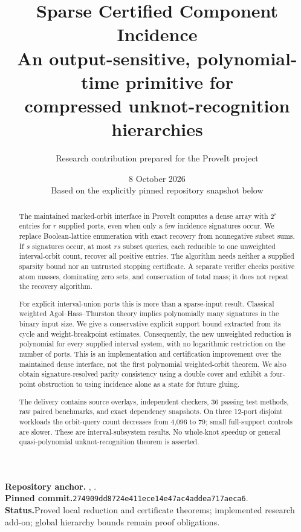 \documentclass[11pt,letterpaper]{article}
\title{\vspace{-1em}\textbf{Sparse Certified Component Incidence}\\[0.4em]
\Large An output-sensitive, polynomial-time primitive for\\
compressed unknot-recognition hierarchies}
\author{Research contribution prepared for the ProveIt project}
\date{8 October 2026\\[0.3em]\small Based on the explicitly pinned repository snapshot below}
\theoremstyle{definition}
\newcommand{\snapshot}{\texttt{274909dd8724e411ece14e47ac4addea717aeca6}}
\begin{document}
\maketitle
\thispagestyle{empty}
\begin{abstract}
The maintained marked-orbit interface in ProveIt computes a dense array with
$2^r$ entries for $r$ supplied ports, even when only a few incidence signatures
occur. We replace Boolean-lattice enumeration with exact recovery from
nonnegative subset sums. If $s$ signatures occur, at most $rs$ subset queries,
each reducible to one unweighted interval-orbit count, recover all positive
entries. The algorithm needs neither a supplied sparsity bound nor an
untrusted stopping certificate. A separate verifier checks positive atom
masses, dominating zero sets, and conservation of total mass; it does not
repeat the recovery algorithm.

For explicit interval-union ports this is more than a sparse-input result.
Classical weighted Agol--Hass--Thurston theory implies polynomially many
signatures in the binary input size. We give a conservative explicit support
bound extracted from its cycle and weight-breakpoint estimates. Consequently,
the new unweighted reduction is polynomial for every supplied interval system,
with no logarithmic restriction on the number of ports. This is an
implementation and certification improvement over the maintained dense
interface, not the first polynomial weighted-orbit theorem. We also obtain
signature-resolved parity consistency using a double cover and exhibit a
four-point obstruction to using incidence alone as a state for future gluing.

The delivery contains source overlays, independent checkers, 36 passing test
methods, raw paired benchmarks, and exact dependency snapshots. On three
12-port disjoint workloads the orbit-query count decreases from 4,096 to 79;
small full-support controls are slower. These are interval-subsystem results.
No whole-knot speedup or general quasi-polynomial unknot-recognition theorem
is asserted.
\end{abstract}
\vspace{0.5em}
\noindent\textbf{Repository anchor.}\quad
{},\quad
{}.\\
\noindent\textbf{Pinned commit.}\quad\snapshot.\\
\noindent\textbf{Status.}\quad Proved local reduction and certificate theorems;
implemented research add-on; global hierarchy bounds remain proof obligations.
\clearpage
\tableofcontents
\clearpage
\end{document}
